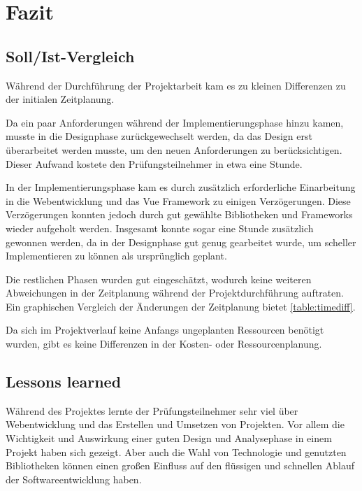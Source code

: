 \documentclass[11pt]{article}
\begin{document}
%
%

\section{Fazit}


\subsection{Soll/Ist-Vergleich}

Während der Durchführung der Projektarbeit kam es zu kleinen Differenzen zu der initialen Zeitplanung.

Da ein paar Anforderungen während der Implementierungsphase hinzu kamen, musste in die Designphase zurückgewechselt werden, da
das Design erst überarbeitet werden musste, um den neuen Anforderungen zu berücksichtigen. Dieser Aufwand kostete den Prüfungsteilnehmer in etwa eine Stunde. 

In der Implementierungsphase kam es durch zusätzlich erforderliche Einarbeitung in die Webentwicklung und das Vue Framework zu einigen Verzögerungen.
Diese Verzögerungen konnten jedoch durch gut gewählte Bibliotheken und Frameworks wieder aufgeholt werden.
Insgesamt konnte sogar eine Stunde zusätzlich gewonnen werden, da in der Designphase gut genug gearbeitet wurde,
um scheller Implementieren zu können als ursprünglich geplant. 

Die restlichen Phasen wurden gut eingeschätzt, wodurch keine weiteren Abweichungen in der Zeitplanung während der 
Projektdurchführung auftraten.\newline
Ein graphischen Vergleich der Änderungen der Zeitplanung bietet \autoref{table:timediff}.

Da sich im Projektverlauf keine Anfangs ungeplanten Ressourcen benötigt wurden, gibt es keine Differenzen in der Kosten- oder
Ressourcenplanung.


\subsection{Lessons learned}

Während des Projektes lernte der Prüfungsteilnehmer sehr viel über Webentwicklung und das Erstellen und Umsetzen von Projekten.
Vor allem die Wichtigkeit und Auswirkung einer guten Design und Analysephase in einem Projekt haben sich gezeigt.
Aber auch die Wahl von Technologie und genutzten Bibliotheken können einen großen Einfluss auf den flüssigen und schnellen
Ablauf der Softwareentwicklung haben.
\end{document}
